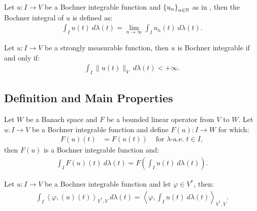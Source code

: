 \begin{definition}
    Let $u\colon I \rightarrow V$ be a Bochner integrable function and $\left\{ u_n \right\}_{n \in \mathbb{N}}$ as in , then the Bochner integral of $u$ is defined as:
    \begin{align}
        \int_I u(t) ~ d \lambda(t) = \lim_{n \rightarrow \infty} \int_I u_n(t) ~ d \lambda(t).
    \end{align}
\end{definition}

\begin{theorem}[Bochner]
    Let $u\colon I \rightarrow V$ be a strongly measurable function, then $u$ is Bochner integrable if and only if:
    \begin{align}
        \int_I \lVert u(t) \rVert_V ~ d \lambda(t) < + \infty.
    \end{align}
\end{theorem}

\newpage
\subsection{Definition and Main Properties}

\begin{corollary}
    Let $W$ be a Banach space and $F$ be a bounded linear operator from $V$ to $W$. Let $u\colon I \rightarrow V$ be a Bochner integrable function and define $F(u) \colon I \rightarrow W$ for which:
    \begin{align}
        F(u)(t) &= F(u(t)) &\text{ for } \lambda \text{-a.e. } t \in I,
    \end{align}
    then $F(u)$ is a Bochner integrable function and:
    \begin{align}
        \int_I F(u)(t) ~ d \lambda(t) = F\left( \int_I u(t) ~ d \lambda(t) \right).
    \end{align}
\end{corollary}

\begin{remark} %
    Let $u\colon I \rightarrow V$ be a Bochner integrable function and let $\varphi \in V^*$, then:
    \begin{align}
        \int_I \left\langle \varphi, (u)(t) \right\rangle_{V^*, V} ~ d \lambda(t) = \left\langle \varphi, \int_I u(t) ~ d \lambda(t) \right\rangle_{V^*, V}.
    \end{align}
\end{remark}


